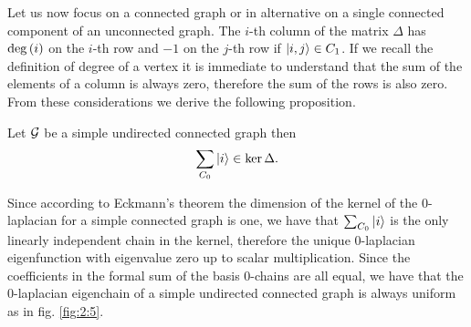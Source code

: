 \documentclass[../2.tex]{subfiles}
\begin{document}
Let us now focus on a connected graph or in alternative on a single connected component of an unconnected graph. 
The $i$-th column of the matrix $\Delta$ has $\operatorname{deg}{(i)}$ on the $i$-th row and $-1$ on the $j$-th row if $| i,j \rangle \in C_1$. If we recall the definition of degree of a vertex
it is immediate to understand that the sum of the elements of a column is always zero, therefore the sum of the rows is also zero. From these considerations
we derive the following proposition.

\begin{prop}
    Let $\mathcal{G}$ be a simple undirected connected graph then 
    \[ \sum_{C_0} | i \rangle \in \ker\Delta. \]
\end{prop}

Since according to Eckmann's theorem the dimension of the kernel of the $0$-laplacian for a simple connected graph is one, 
we have that $\sum_{C_0} | i \rangle$ is the only linearly independent chain in the kernel, therefore the unique $0$-laplacian eigenfunction
with eigenvalue zero up to scalar multiplication. Since the coefficients in the formal sum of the basis $0$-chains are all equal, we have that the $0$-laplacian eigenchain
of a simple undirected connected graph is always uniform as in fig. \ref{fig:2:5}.\\
\hfill \\
\end{document}
